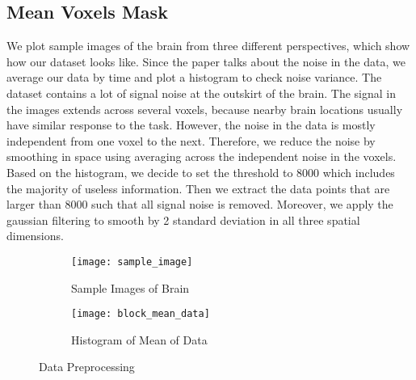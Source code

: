\subsection{Mean Voxels Mask}

We plot sample images of the brain from three different perspectives, which 
show how our dataset looks like. Since the paper talks about the noise 
in the data, we average our data by time and plot a histogram to check noise 
variance. The dataset contains a lot of signal noise at the outskirt of the 
brain. The signal in the images extends across several voxels, because nearby 
brain locations usually have similar response to the task. However, the noise 
in the data is mostly independent from one voxel to the next. Therefore, we 
reduce the noise by smoothing in space using averaging across the independent 
noise in the voxels. Based on the histogram, we decide to set the threshold to 
8000 which includes the majority of useless information. Then we extract the data 
points that are larger than 8000 such that all signal noise is removed. Moreover, 
we apply the gaussian filtering to smooth by 2 standard deviation in all three 
spatial dimensions.

\begin{figure}[!h]
\centering
\begin{subfigure}{.45\textwidth}
  \texttt{[image: sample\_image]}
  \caption{Sample Images of Brain}
\end{subfigure}%
\begin{subfigure}{.6\textwidth}
  \texttt{[image: block\_mean\_data]}
  \centering
  \caption{Histogram of Mean of Data}
\end{subfigure}
\caption{Data Preprocessing\label{fig:datapre}}
\end{figure}


